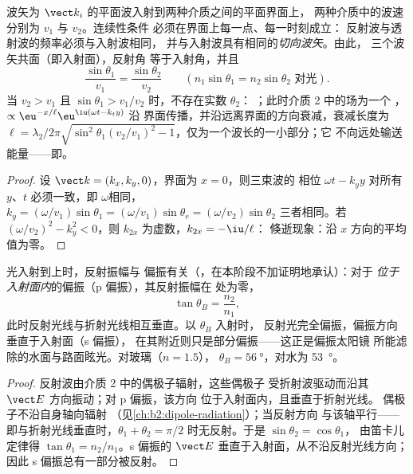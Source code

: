\begin{theorem}[反射与折射定律]\label{thm:b2:wave-interfaces:snell}
波矢为 $\vect k_i$ 的平面波入射到两种介质之间的平面界面上，
两种介质中的波速分别为 $v_1$ 与 $v_2$。连续性条件
必须在界面上每一点、每一时刻成立：
反射波与透射波的频率必须与入射波相同，
并与入射波具有相同的\emph{切向波矢}。由此，
三个波矢共面（即入射面），反射角
等于入射角，并且
\[
\frac{\sin\theta_1}{v_1} = \frac{\sin\theta_2}{v_2} \qquad (n_1\sin\theta_1 = n_2\sin\theta_2 \text{ 对光}) .
\]
当 $v_2 > v_1$ 且 $\sin\theta_1 > v_1/v_2$ 时，不存在实数 $\theta_2$：
\emph{}；此时介质 2 中的场为一个
\emph{}，$\propto\eu^{-x/\ell}\eu^{\iu(\omega t - k_ty)}$ 沿
界面传播，并沿远离界面的方向衰减，衰减长度为 $\ell = \lambda_2/2\pi
\sqrt{\sin^2\theta_1(v_2/v_1)^2 - 1}$，仅为一个波长的一小部分；它
不向远处输送能量——即。
\end{theorem}

\begin{proof}
设 $\vect k = (k_x, k_y, 0)$，界面为 $x = 0$，则三束波的
相位 $\omega t - k_yy$ 对所有 $y$、$t$ 必须一致，即
$\omega$相同，$k_y = (\omega/v_1)\sin\theta_1 = (\omega/v_1)\sin\theta_r = (\omega/v_2)\sin
\theta_2$ 三者相同。若 $(\omega/v_2)^2 - k_y^2 < 0$，则 $k_{2x}$ 为虚数，$k_{2x} = -\iu/\ell$：
倏逝现象：沿 $x$ 方向的平均值为零。
\end{proof}

\begin{proposition}\label{prop:b2:wave-interfaces:brewster}
光入射到上时，反射振幅与
偏振有关（，在本阶段不加证明地承认）：对于
\emph{位于入射面内}的偏振（p 偏振），其反射振幅在
\emph{}处为零，
\[
\tan\theta_B = \frac{n_2}{n_1} ,
\]
此时反射光线与折射光线相互垂直。以 $\theta_B$ 入射时，
反射光完全偏振，偏振方向垂直于入射面（s 偏振），
在其附近则只是部分偏振——这正是偏振太阳镜
所能滤除的水面与路面眩光。对玻璃（$n = 1.5$），
$\theta_B = \qty{56}{\degree}$，对水为 \qty{53}{\degree}。
\end{proposition}

\begin{proof}
反射波由介质 2 中的偶极子辐射，这些偶极子
受折射波驱动而沿其 $\vect E$ 方向振动；对 p 偏振，该方向
位于入射面内，且垂直于折射光线。
偶极子不沿自身轴向辐射
（见\cref{ch:b2:dipole-radiation}）；当反射方向
与该轴平行——即与折射光线垂直时，$\theta_1
+ \theta_2 = \pi/2$ 时无反射。于是 $\sin\theta_2 = \cos\theta_1$，
由笛卡儿定律得 $\tan\theta_1 = n_2/n_1$。s 偏振的 $\vect E$
垂直于入射面，从不沿反射光线方向；
因此 s 偏振总有一部分被反射。
\end{proof}

